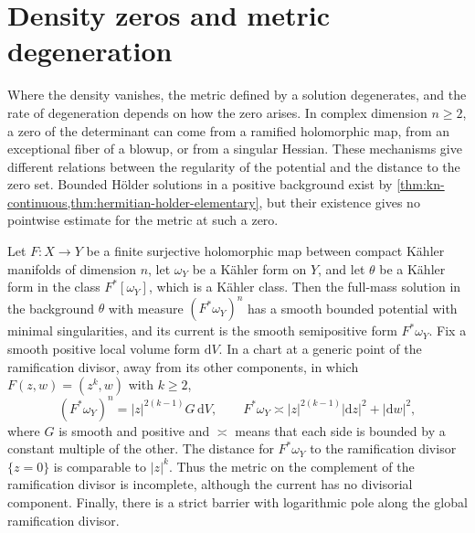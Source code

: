 \section{Density zeros and metric degeneration}\label{sec:geometric-zeros}

Where the density vanishes, the metric defined by a solution degenerates, and the rate of degeneration depends on how the zero arises. In complex dimension $n\geq2$, a zero of the determinant can come from a ramified holomorphic map, from an exceptional fiber of a blowup, or from a singular Hessian. These mechanisms give different relations between the regularity of the potential and the distance to the zero set. Bounded H\"older solutions in a positive background exist by \cref{thm:kn-continuous,thm:hermitian-holder-elementary}, but their existence gives no pointwise estimate for the metric at such a zero.

\begin{proposition}\label{prop:finite-map-zero}
Let $F\colon X\to Y$ be a finite surjective holomorphic map between compact K\"ahler manifolds of dimension $n$, let $\omega_Y$ be a K\"ahler form on $Y$, and let $\theta$ be a K\"ahler form in the class $F^*[\omega_Y]$, which is a K\"ahler class. Then the full-mass solution in the background $\theta$ with measure $(F^*\omega_Y)^n$ has a smooth bounded potential with minimal singularities, and its current is the smooth semipositive form $F^*\omega_Y$. Fix a smooth positive local volume form $\mathrm{d}V$. In a chart at a generic point of the ramification divisor, away from its other components, in which $F(z,w)=(z^k,w)$ with $k\geq2$,
\begin{equation}\label{eq:branch-tensor}
 (F^*\omega_Y)^n=|z|^{2(k-1)}G\,\mathrm{d} V,
 \qquad
 F^*\omega_Y\asymp |z|^{2(k-1)}|\mathrm{d} z|^2+|\mathrm{d} w|^2,
\end{equation}
where $G$ is smooth and positive and $\asymp$ means that each side is bounded by a constant multiple of the other. The distance for $F^*\omega_Y$ to the ramification divisor $\{z=0\}$ is comparable to $|z|^k$. Thus the metric on the complement of the ramification divisor is incomplete, although the current has no divisorial component. Finally, there is a strict barrier with logarithmic pole along the global ramification divisor.
\end{proposition}

